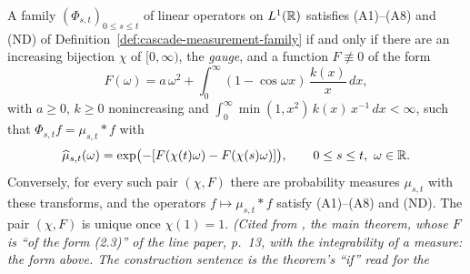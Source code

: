 \begin{theorem}
\label{thm:cited-A4}
\leanok
{}
A family $(\Phi_{s,t})_{0 \le s \le t}$ of linear operators on $L^1(\mathbb{R})$ satisfies (A1)--(A8)
and (ND) of Definition~\ref{def:cascade-measurement-family} if and only if there are an increasing
bijection $\chi$ of $[0,\infty)$, the \emph{gauge}, and a function $F \not\equiv 0$ of the form
\[
  F(\omega) = a\,\omega^2 + \int_0^\infty(1 - \cos\omega x)\,\frac{k(x)}{x}\,dx,
\]
with $a \ge 0$, $k \ge 0$ nonincreasing and
$\int_0^\infty\min(1, x^2)\,k(x)\,x^{-1}\,dx < \infty$, such that $\Phi_{s,t}f = \mu_{s,t} * f$ with
\[
  \widehat\mu_{s,t}(\omega) = \exp\bigl(-[F(\chi(t)\omega) - F(\chi(s)\omega)]\bigr),
  \qquad 0 \le s \le t,\ \omega \in \mathbb{R}.
\]
Conversely, for every such pair $(\chi, F)$ there are probability measures $\mu_{s,t}$ with
these transforms, and the operators $f \mapsto \mu_{s,t} * f$ satisfy (A1)--(A8) and (ND).
The pair $(\chi, F)$ is unique once $\chi(1) = 1$.
\statusA\quad{}\quad\emph{(Cited from , the main
theorem, whose $F$ is ``of the form (2.3)'' of the line paper, p.~13, with the integrability of a
\Levy{} measure: the form above. The construction sentence is the theorem's ``if'' read for the
}
\end{theorem}
